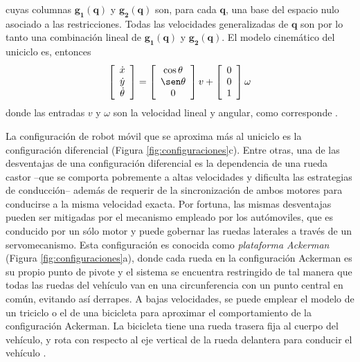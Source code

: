 cuyas columnas $\mathbf{g_{1}(q)}$ y $\mathbf{g_{2}(q)}$ son, para cada $\mathbf{q}$, una base del espacio nulo asociado a las restricciones. Todas las velocidades generalizadas de $\mathbf{q}$ son por lo tanto una combinación lineal de $\mathbf{g_{1}(q)}$ y $\mathbf{g_{2}(q)}$. El modelo cinemático del uniciclo es, entonces
\begin{equation}
	\left[\begin{array}{c}
	\dot{x}\\
	\dot{y}\\
	\dot{\theta}\\
	\end{array}\right]=\left[\begin{array}{c}
	\cos\theta\\
	\sen\theta\\
	0\\
	\end{array}\right]v+
	\left[\begin{array}{c}
	0\\
	0\\
	1\\
	\end{array}\right]\omega
\end{equation}
donde las entradas $v$ y $\omega$ son la velocidad lineal y angular, como corresponde \cite{sicilianoRoboticsModellingPlanning2009}.
\par La configuración de robot móvil que se aproxima más al uniciclo es la configuración diferencial (Figura \ref{fig:configuraciones}c). Entre otras, una de las desventajas de una configuración diferencial es la dependencia de una rueda castor --que se comporta pobremente a altas velocidades y dificulta las estrategias de conducción-- además de requerir de la sincronización de ambos motores para conducirse a la misma velocidad exacta. Por fortuna, las mismas desventajas pueden ser mitigadas por el mecanismo empleado por los autómoviles, que es conducido por un sólo motor y puede gobernar las ruedas laterales a través de un servomecanismo. Esta configuración es conocida como {\it plataforma Ackerman} (Figura \ref{fig:configuraciones}a), donde cada rueda en la configuración Ackerman es su propio punto de pivote y el sistema se encuentra restringido de tal manera que todas las ruedas del vehículo van en una circunferencia con un punto central en común, evitando así derrapes. A bajas velocidades, se puede emplear el modelo de un triciclo o el de una bicicleta para aproximar el comportamiento de la configuración Ackerman. La bicicleta tiene una rueda trasera fija al cuerpo del vehículo, y rota con respecto al eje vertical de la rueda delantera para conducir el vehículo \cite{corellnikolausIntroductionAutonomousRobots2014}.
